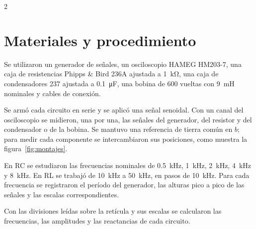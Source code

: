 \documentclass[10pt,letterpaper]{article}
\begin{document}
\begin{multicols}{2}
\section{Materiales y procedimiento}
Se utilizaron un generador de señales, un osciloscopio HAMEG HM203-7, una caja de resistencias Phipps \& Bird 236A ajustada a \SI{1}{\kilo\ohm}, una caja de condensadores 237 ajustada a \SI{0.1}{\micro\farad}, una bobina de 600 vueltas con \SI{9}{\milli\henry} nominales y cables de conexión.

Se armó cada circuito en serie y se aplicó una señal senoidal. Con un canal del osciloscopio se midieron, una por una, las señales del generador, del resistor y del condensador o de la bobina. Se mantuvo una referencia de tierra común en $b$; para medir cada componente se intercambiaron sus posiciones, como muestra la figura~\ref{fig:montajes}.

En RC se estudiaron las frecuencias nominales de \SI{0.5}{\kilo\hertz}, \SI{1}{\kilo\hertz}, \SI{2}{\kilo\hertz}, \SI{4}{\kilo\hertz} y \SI{8}{\kilo\hertz}. En RL se trabajó de \SI{10}{\kilo\hertz} a \SI{50}{\kilo\hertz}, en pasos de \SI{10}{\kilo\hertz}. Para cada frecuencia se registraron el período del generador, las alturas pico a pico de las señales y las escalas correspondientes.

Con las divisiones leídas sobre la retícula y sus escalas se calcularon las frecuencias, las amplitudes y las reactancias de cada circuito.
\end{multicols}

\begin{center}

\label{fig:montajes}
\end{center}
\end{document}
